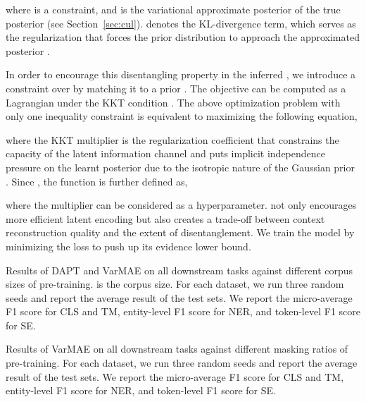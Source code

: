 \documentclass[11pt]{article}
\begin{document}
where  is a constraint, and
 is the variational approximate posterior of the true posterior  (see Section~\ref{sec:cul}).
 denotes the KL-divergence term, which serves as the regularization that forces the prior distribution  to approach the approximated posterior .

In order to encourage this disentangling property in the inferred \cite{DBLP:conf/iclr/HigginsMPBGBML17},
we introduce a constraint  over  by matching it to a prior .
The objective can be computed as a Lagrangian under the KKT condition \cite{bertsekas1997nonlinear,karush2014minima}.
The above optimization problem with only one inequality constraint is equivalent to maximizing the following equation,

where the KKT multiplier  is the regularization coefficient that constrains the capacity of the latent information channel  and puts implicit independence pressure on the learnt posterior due to the isotropic nature of the Gaussian prior .
Since , the function is further defined as,

where the multiplier  can be considered as a hyperparameter.
 not only encourages more efficient latent encoding but also creates a trade-off between context reconstruction quality and the extent of disentanglement.
We train the model by minimizing the loss  to push up its evidence lower bound.



\begin{table*}[t]
    \centering
    \caption{Results of DAPT and VarMAE on all
downstream tasks against different corpus sizes of pre-training.  is the corpus size. 
    For each dataset, we run three random seeds and report the average result of the test sets.
    We report the micro-average F1 score for CLS and TM, entity-level F1 score for NER, and token-level F1 score for SE.
    }
    \label{tab:pretrain_corpus_full}
\end{table*}


\begin{table*}[t]
    \centering
      \resizebox{\linewidth}{!}{}
    \caption{Results of VarMAE on all downstream tasks against different masking ratios of pre-training.
    For each dataset, we run three random seeds and report the average result of the test sets.
    We report the micro-average F1 score for CLS and TM, entity-level F1 score for NER, and token-level F1 score for SE.
    }
    \label{tab:pretrain_mask_full}
\end{table*}
\end{document}
